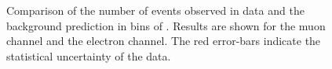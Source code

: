 


\begin{figure}
\centering
{}\quad
{}\quad
\caption[Comparison of predicted and observed event yields in bins of
\STlep]{Comparison of the number of events observed in data and the background
  prediction in bins of \STlep. Results are shown for 
  the muon channel and  the electron channel. The red
  error-bars indicate the statistical uncertainty of the data.}
\label{fig:susy_pred}
\end{figure}
